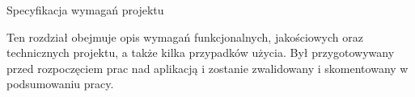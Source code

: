 \begin{chapter}{Specyfikacja wymagań projektu}
	\newcommand{\chapterPath}{rozdzialy/2_wymagania}
	
	Ten rozdział obejmuje opis wymagań funkcjonalnych, jakościowych oraz technicznych projektu, a także kilka przypadków użycia. Był przygotowywany przed rozpoczęciem prac nad aplikacją i zostanie zwalidowany i skomentowany w podsumowaniu pracy.

	
	
	
	
\end{chapter}
